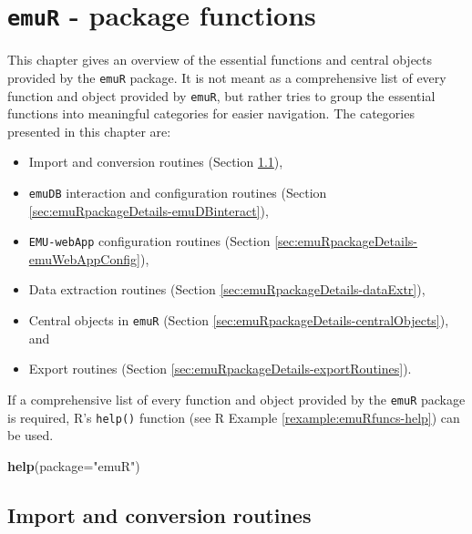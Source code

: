 \documentclass[]{book}
\newenvironment{Shaded}{\begin{snugshade}}{\end{snugshade}}
\newcommand{\DataTypeTok}[1]{\textcolor[rgb]{0.13,0.29,0.53}{#1}}
\newcommand{\KeywordTok}[1]{\textcolor[rgb]{0.13,0.29,0.53}{\textbf{#1}}}
\newcommand{\NormalTok}[1]{#1}
\newcommand{\StringTok}[1]{\textcolor[rgb]{0.31,0.60,0.02}{#1}}
\providecommand{\tightlist}{%
  \setlength{\itemsep}{0pt}\setlength{\parskip}{0pt}}
\theoremstyle{definition}
\theoremstyle{definition}
\theoremstyle{definition}
\theoremstyle{remark}
\begin{document}
\hypertarget{chap:emuRpackageDetails}{%
\chapter{\texorpdfstring{\texttt{emuR} - package
functions}{emuR - package functions}}\label{chap:emuRpackageDetails}}

This chapter gives an overview of the essential functions and central
objects provided by the \texttt{emuR} package. It is not meant as a
comprehensive list of every function and object provided by
\texttt{emuR}, but rather tries to group the essential functions into
meaningful categories for easier navigation. The categories presented in
this chapter are:

\begin{itemize}
\tightlist
\item
  Import and conversion routines (Section
  \ref{sec:emuRpackageDetails-importRoutines}),
\item
  \texttt{emuDB} interaction and configuration routines (Section
  \ref{sec:emuRpackageDetails-emuDBinteract}),
\item
  \texttt{EMU-webApp} configuration routines (Section
  \ref{sec:emuRpackageDetails-emuWebAppConfig}),
\item
  Data extraction routines (Section
  \ref{sec:emuRpackageDetails-dataExtr}),
\item
  Central objects in \texttt{emuR} (Section
  \ref{sec:emuRpackageDetails-centralObjects}), and
\item
  Export routines (Section \ref{sec:emuRpackageDetails-exportRoutines}).
\end{itemize}

If a comprehensive list of every function and object provided by the
\texttt{emuR} package is required, R's \texttt{help()} function (see R
Example \ref{rexample:emuRfuncs-help}) can be used.

\begin{Shaded}
\begin{Highlighting}[]
\KeywordTok{help}\NormalTok{(}\DataTypeTok{package=}\StringTok{"emuR"}\NormalTok{)}
\end{Highlighting}
\end{Shaded}

\hypertarget{sec:emuRpackageDetails-importRoutines}{%
\section{Import and conversion
routines}\label{sec:emuRpackageDetails-importRoutines}}
\end{document}
